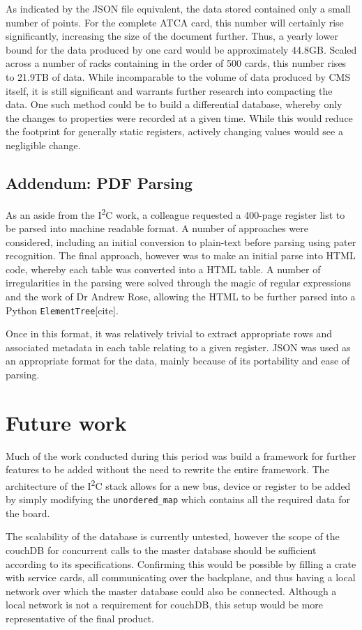 \documentclass[a4paper,11pt,twocolumn]{article}
\begin{document}
	As indicated by the JSON file equivalent, the data stored contained only a small number of points. For the complete ATCA card, this number will certainly rise significantly, increasing the size of the document further. Thus, a yearly lower bound for the data produced by one card would be approximately 44.8GB. Scaled across a number of racks containing in the order of 500 cards, this number rises to 21.9TB of data. While incomparable to the volume of data produced by CMS itself, it is still significant and warrants further research into compacting the data. One such method could be to build a differential database, whereby only the changes to properties were recorded at a given time. While this would reduce the footprint for generally static registers, actively changing values would see a negligible change.

	\subsection{Addendum: PDF Parsing}
	As an aside from the I\textsuperscript{2}C work, a colleague requested a 400-page register list to be parsed into machine readable format. A number of approaches were considered, including an initial conversion to plain-text before parsing using pater recognition. The final approach, however was to make an initial parse into HTML code, whereby each table was converted into a HTML table. A number of irregularities in the parsing were solved through the magic of regular expressions and the work of Dr Andrew Rose, allowing the HTML to be further parsed into a Python \verb|ElementTree|[cite].

	Once in this format, it was relatively trivial to extract appropriate rows and associated metadata in each table relating to a given register. JSON was used as an appropriate format for the data, mainly because of its portability and ease of parsing.

	\section{Future work}
	Much of the work conducted during this period was build a framework for further features to be added without the need to rewrite the entire framework. The architecture of the I\textsuperscript{2}C stack allows for a new bus, device or register to be added by simply modifying the \verb|unordered_map| which contains all the required data for the board.

	The scalability of the database is currently untested, however the scope of the couchDB for concurrent calls to the master database should be sufficient according to its specifications. Confirming this would be possible by filling a crate with service cards, all communicating over the backplane, and thus having a local network over which the master database could also be connected. Although a local network is not a requirement for couchDB, this setup would be more representative of the final product.
\end{document}
